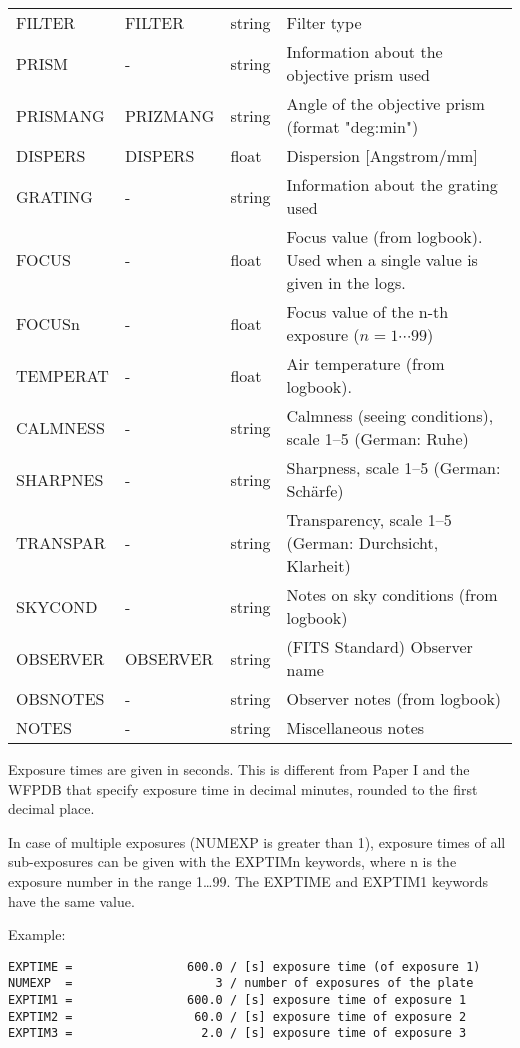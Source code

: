 \documentclass[11pt]{ivoa}
\begin{document}
\begin{longtable}{lllp{}}
FILTER    &FILTER   &string  &Filter type\\
PRISM     &-        &string  &
  Information about the objective prism used\\
PRISMANG  &PRIZMANG &string  &
  Angle of the objective prism (format "deg:min")\\
DISPERS   &DISPERS  &float   &Dispersion [Angstrom/mm]\\
GRATING   &-        &string  &Information about the grating used\\
FOCUS     &-        &float   &
  Focus value (from logbook). Used when a single value is given in the
  logs.\\
FOCUSn    &-        &float   &
  Focus value of the n-th exposure ($n = 1\cdots 99$)\\
TEMPERAT  &-        &float   &Air temperature (from logbook).\\
CALMNESS  &-        &string  &
  Calmness (seeing conditions), scale 1–5 (German: Ruhe)\\
SHARPNES  &-        &string  &Sharpness, scale 1–5 (German: Schärfe)\\
TRANSPAR  &-        &string  &
  Transparency, scale 1–5 (German: Durchsicht, Klarheit)\\
SKYCOND   &-        &string  &Notes on sky conditions (from logbook)\\
OBSERVER  &OBSERVER &string  &(FITS Standard) Observer name\\
OBSNOTES  &-        &string  &Observer notes (from logbook)\\
NOTES     &-        &string  &Miscellaneous notes \\

\end{longtable}
\endgroup

Exposure times are given in seconds. This is different from Paper I and
the WFPDB that specify exposure time in decimal minutes, rounded to the
first decimal place.

In case of multiple exposures (NUMEXP is greater than 1), exposure times
of all sub-exposures can be given with the EXPTIMn keywords, where n is
the exposure number in the range 1…99. The EXPTIME and EXPTIM1 keywords
have the same value.

Example:

\begin{lstlisting}
EXPTIME =                600.0 / [s] exposure time (of exposure 1)
NUMEXP  =                    3 / number of exposures of the plate
EXPTIM1 =                600.0 / [s] exposure time of exposure 1
EXPTIM2 =                 60.0 / [s] exposure time of exposure 2
EXPTIM3 =                  2.0 / [s] exposure time of exposure 3
\end{lstlisting}
\end{document}
